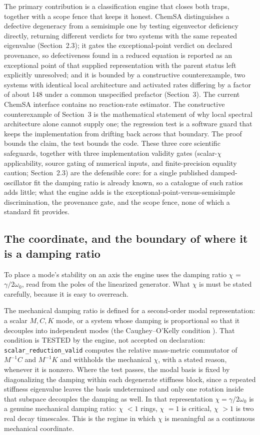 The primary contribution is a classification engine that closes both traps, together with a scope fence that keeps it honest. ChemSA distinguishes a defective degeneracy from a semisimple one by testing eigenvector deficiency directly, returning different verdicts for two systems with the same repeated eigenvalue (Section~2.3); it gates the exceptional-point verdict on declared provenance, so defectiveness found in a reduced equation is reported as an exceptional point of that supplied representation with the parent status left explicitly unresolved; and it is bounded by a constructive counterexample, two systems with identical local architecture and activated rates differing by a factor of about 148 under a common unspecified prefactor (Section~3). The current ChemSA interface contains no reaction-rate estimator. The constructive counterexample of Section~3 is the mathematical statement of why local spectral architecture alone cannot supply one; the regression test is a software guard that keeps the implementation from drifting back across that boundary. The proof bounds the claim, the test bounds the code. These three core scientific safeguards, together with three implementation validity gates (scalar-\(\chi\) applicability, source gating of numerical inputs, and finite-precision equality caution; Section~2.3) are the defensible core: for a single published damped-oscillator fit the damping ratio is already known, so a catalogue of such ratios adds little; what the engine adds is the exceptional-point-versus-semisimple discrimination, the provenance gate, and the scope fence, none of which a standard fit provides.

\subsection{The coordinate, and the boundary of where it is a damping ratio}

To place a mode's stability on an axis the engine uses the damping ratio $\chi$ = \(\gamma/2\omega_0\), read from the poles of the linearized generator. What $\chi$ is must be stated carefully, because it is easy to overreach.

The mechanical damping ratio is defined for a second-order modal representation: a scalar \(M,C,K\) mode, or a system whose damping is proportional so that it decouples into independent modes (the Caughey--O'Kelly condition \citep{caughey}). That condition is TESTED by the engine, not accepted on declaration: \texttt{scalar\_reduction\_valid} computes the relative mass-metric commutator of \(M^{-1}C\) and \(M^{-1}K\) and withholds the mechanical \(\chi\), with a stated reason, whenever it is nonzero. Where the test passes, the modal basis is fixed by diagonalizing the damping within each degenerate stiffness block, since a repeated stiffness eigenvalue leaves the basis undetermined and only one rotation inside that subspace decouples the damping as well. In that representation \(\chi = \gamma/2\omega_0\) is a genuine mechanical damping ratio: $\chi$ \(<1\) rings, $\chi$ \(=1\) is critical, $\chi$ \(>1\) is two real decay timescales. This is the regime in which $\chi$ is meaningful as a continuous mechanical coordinate.

